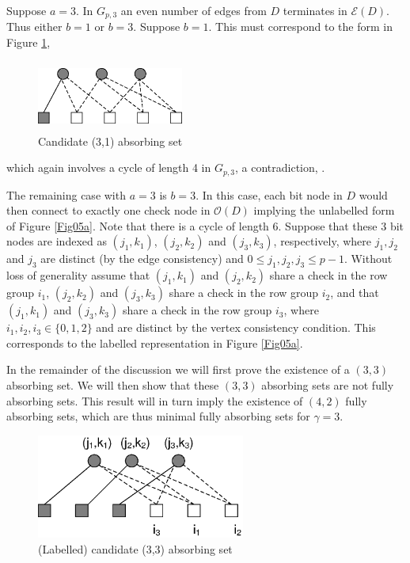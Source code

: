 Suppose $a=3$. In $G_{p,3}$ an even number of edges from $D$
terminates in $\mathcal{E}(D)$. Thus either $b=1$ or $b=3$.
Suppose $b=1$. This must correspond to the form in Figure
\ref{Fig06},
\begin{figure}
\center\includegraphics[width=1.9in,height=0.9in]{fig06a.eps}
\caption{Candidate (3,1) absorbing set}\label{Fig06}
\end{figure}
which again involves a cycle of length 4 in $G_{p,3}$, a
contradiction, \cite{fan}.

The remaining case with $a=3$ is $b=3$. In this case, each bit
node in $D$ would then connect to exactly one check node in
$\mathcal{O}(D)$ implying the unlabelled form of Figure
\ref{Fig05a}.
Note that there is a cycle of length 6. Suppose that these $3$ bit
nodes are indexed as $(j_1,k_1)$, $(j_2,k_2)$ and $(j_3,k_3)$,
respectively, where $j_1,j_2$ and $j_3$ are distinct (by the edge
consistency) and $0 \leq j_1, j_2, j_3 \leq p-1$. Without loss of
generality assume that $(j_1,k_1)$ and $(j_2,k_2)$ share a check
in the row group $i_1$, $(j_2,k_2)$ and $(j_3,k_3)$ share a check
in the row group $i_2$, and that $(j_1,k_1)$ and $(j_3,k_3)$ share
a check in the row group $i_3$, where $i_1,i_2,i_3 \in \{0,1,2\}$
and are distinct by the vertex consistency condition. This
corresponds to the labelled representation in Figure \ref{Fig05a}.

In the remainder of the discussion we will first prove the
existence of a $(3,3)$ absorbing set. We will then show that these
$(3,3)$ absorbing sets are not fully absorbing sets. This result
will in turn imply the existence of $(4,2)$ fully absorbing sets,
which are thus minimal fully absorbing sets for $\gamma=3$.

\begin{figure}
\center\includegraphics[width=2.7in,height=1.35in]{fig05a.ps}
\caption{(Labelled) candidate (3,3) absorbing set}\label{Fig05}
\end{figure}

